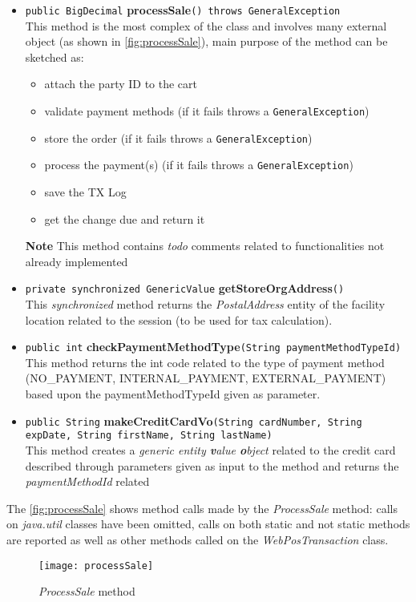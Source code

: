 \begin{itemize}
   \item \label{method:processSale} \texttt{public BigDecimal} \textbf{processSale}\texttt{() throws GeneralException}\\
   This method is the most complex of the class and involves many external object (as shown in \autoref{fig:processSale}), main purpose of the method can be sketched as:
   \begin{itemize}
   		\item attach the party ID to the cart
    	\item validate payment methods (if it fails throws a \texttt{GeneralException})
    	\item store the order (if it fails throws a \texttt{GeneralException})
    	\item process the payment(s) (if it fails throws a \texttt{GeneralException})
   		\item save the TX Log
   		\item get the change due and return it
   \end{itemize}
   \textbf{Note} This method contains \emph{todo} comments related to functionalities not already implemented
   \item \texttt{private synchronized GenericValue} \textbf{getStoreOrgAddress}\texttt{()} \\ This \emph{synchronized} method returns the \emph{PostalAddress} entity of the facility location related to the session (to be used for tax calculation).
   \item \texttt{public int} \textbf{checkPaymentMethodType}\texttt{(String paymentMethodTypeId)} \\ This method returns the int code related to the type of payment method (NO\_PAYMENT, INTERNAL\_PAYMENT, EXTERNAL\_PAYMENT) based upon the paymentMethodTypeId given as parameter.
   \item \texttt{public String} \textbf{makeCreditCardVo}\texttt{(String cardNumber, String expDate, String firstName, String lastName)} \\ This method creates a \textit{generic entity \textbf{v}alue \textbf{o}bject} related to the credit card described through parameters given as input to the method and returns the \textit{paymentMethodId} related
\end{itemize}

The \autoref{fig:processSale} shows method calls made by the \emph{ProcessSale} method: calls on \textit{java.util} classes have been omitted, calls on both static and not static methods are reported as well as other methods called on the \emph{WebPosTransaction} class.

\begin{figure}[h]
			\centering
			\texttt{[image: processSale]}
			\caption{
				\label{fig:processSale} 
				\emph{ProcessSale} method
			}
\end{figure}
